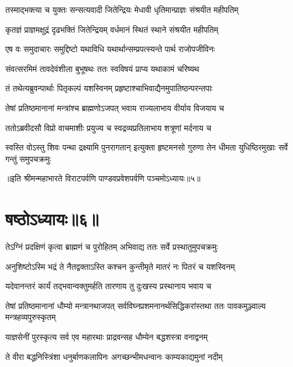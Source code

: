 \twolineshloka
{तस्माद्भक्त्या च युक्तः सन्सत्यवादी जितेन्द्रियः}
{मेधावी धृतिमान्प्राज्ञः संश्रयीत महीपतिम्}


\twolineshloka
{कृतज्ञं प्राज्ञमक्षुद्रं दृढभक्तिं जितेन्द्रियम्}
{वर्धमानं स्थितं स्थाने संश्रयीत महीपतिम्}


\twolineshloka
{एष वः समुदाचारः समुद्दिष्टो यथाविधि}
{यथार्थान्सम्प्रपत्स्यन्ते पार्थ राजोपजीविनः}


\twolineshloka
{संवत्सरमिमं तावदेवंशीला बुभूषथः}
{ततः स्वविषयं प्राप्य यथाकामं चरिष्यथ}



\twolineshloka
{तं तथेत्यब्रुवन्पार्थाः पितृकल्पं यशस्विनम्}
{प्रहृष्टाश्चाभिवाद्यैनमुपातिष्ठन्परन्तपाः}


\twolineshloka
{तेषां प्रतिष्ठमानानां मन्त्रांश्च ब्राह्मणोऽजपत्}
{भवाय राज्यलाभाय वीर्याय विजयाय च}


\twolineshloka
{ततोऽब्रवीदसौ विप्रो वाचमाशीः प्रयुज्य च}
{स्वद्रव्यप्रतिलाभाय शत्रूणां मर्दनाय च}


\threelineshloka
{स्वस्ति वोऽस्तु शिवः पन्था द्रक्ष्यामि पुनरागतान्}
{इत्युक्ता हृष्टमनसो गुरुणा तेन धीमता}
{युधिष्ठिरमुखाः सर्वे गन्तुं समुपचक्रमुः}

॥इति श्रीमन्महाभारते विराटपर्वणि पाण्डवप्रवेशपर्वणि पञ्चमोऽध्यायः॥५॥

\chapter{षष्ठोऽध्यायः॥६॥}

\twolineshloka
{तेऽग्निं प्रदक्षिणं कृत्वा ब्राह्मणं च पुरोहितम्}
{अभिवाद्य ततः सर्वे प्रस्थातुमुपचक्रमुः}




\twolineshloka
{अनुशिष्टोऽस्मि भद्रं ते नैतद्वक्ताऽस्ति कश्चन}
{कुन्तीमृते मातरं नः पितरं च यशस्विनम्}


\twolineshloka
{यदेवानन्तरं कार्यं तद्भवान्वक्तुमर्हति}
{तारणाय तु दुःखस्य प्रस्थानाय भवाय च}



\threelineshloka
{तेषां प्रतिष्ठमानानां धौम्यो मन्त्रानथाजपत्}
{सर्वविघ्नप्रशमनानर्थसिद्धिकरांस्तथा}
{ततः पावकमुञ्ज्वाल्य मन्त्रहव्यपुरुस्कृतम्}


\twolineshloka
{याज्ञसेनीं पुरस्कृत्य सर्व एव महारथाः}
{प्राद्रवन्सह धौम्येन बद्धशस्त्रा वनाद्वनम्}


\twolineshloka
{ते वीरा बद्धनिस्त्रिंशा धनुर्बाणकलापिनः}
{अगच्छन्भीमधन्वानः काम्यकाद्यमुनां नदीम्}


